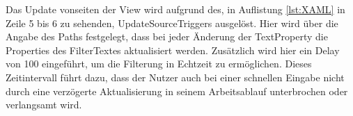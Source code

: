 Das Update vonseiten der View wird aufgrund des, in Auflistung \ref{lst:XAML} in Zeile 5 bis 6 zu sehenden, UpdateSourceTriggers ausgelöst. 
Hier wird über die Angabe des Paths festgelegt, dass bei jeder Änderung der TextProperty die Properties des FilterTextes aktualisiert werden.
Zusätzlich wird hier ein Delay von 100 eingeführt, um die Filterung in Echtzeit zu ermöglichen.
Dieses Zeitintervall führt dazu, dass der Nutzer auch bei einer schnellen Eingabe nicht durch eine verzögerte Aktualisierung in seinem Arbeitsablauf unterbrochen  oder verlangsamt wird.




